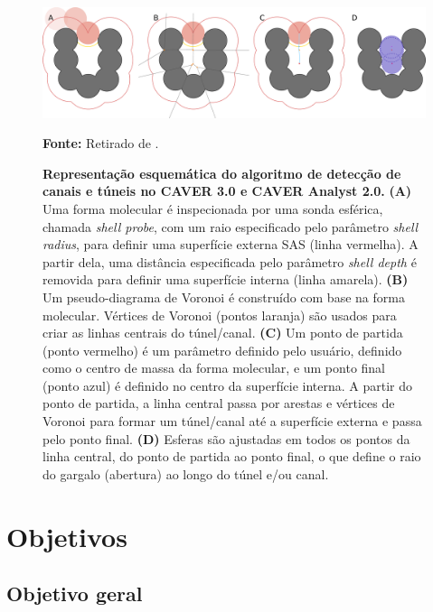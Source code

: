 \documentclass[Portugues]{phdquali}
\begin{document}
\begin{figure}[ht]
  \centerline{\includegraphics[scale=0.18]{images/caver-schema.png}}
  \centerline{\scriptsize{\textbf{Fonte:} Retirado de \cite{guerra2023B}.}}
  \caption[Representação esquemática do algoritmo de detecção de canais e túneis no CAVER 3.0 e CAVER Analyst 2.0]{\textbf{Representação esquemática do algoritmo de detecção de canais e túneis no CAVER 3.0 e CAVER Analyst 2.0.} \textbf{(A)} Uma forma molecular é inspecionada por uma sonda esférica, chamada \textit{shell probe}, com um raio especificado pelo parâmetro \textit{shell radius}, para definir uma superfície externa SAS (linha vermelha). A partir dela, uma distância especificada pelo parâmetro \textit{shell depth} é removida para definir uma superfície interna (linha amarela). \textbf{(B)} Um pseudo-diagrama de Voronoi é construído com base na forma molecular. Vértices de Voronoi (pontos laranja) são usados para criar as linhas centrais do túnel/canal. \textbf{(C)} Um ponto de partida (ponto vermelho) é um parâmetro definido pelo usuário, definido como o centro de massa da forma molecular, e um ponto final (ponto azul) é definido no centro da superfície interna. A partir do ponto de partida, a linha central passa por arestas e vértices de Voronoi para formar um túnel/canal até a superfície externa e passa pelo ponto final. \textbf{(D)} Esferas são ajustadas em todos os pontos da linha central, do ponto de partida ao ponto final, o que define o raio do gargalo (abertura) ao longo do túnel e/ou canal.}
  \label{fig:caver-schema}
\end{figure}



\chapter{Objetivos}

\section{Objetivo geral}
\end{document}
